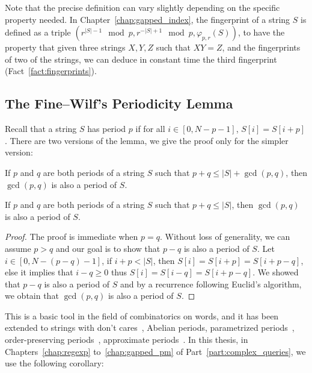 Note that the precise definition can vary slightly depending on the specific property needed. In Chapter~\ref{chap:gapped_index}, the fingerprint of a string $S$ is defined as a triple $(r^{|S|-1} \mod p, r^{-|S|+1} \mod p, \varphi_{p,r}(S))$, to have the property that given three strings $X,Y,Z$ such that $XY =Z$, and the fingerprints of two of the strings, we can deduce in constant time the third fingerprint (Fact~\ref{fact:fingerprints}). 


\subsection{The Fine--Wilf's Periodicity Lemma}\label{sec:prelim:FW}

Recall that a string $S$ has period $p$ if for all $i \in [0,N-p-1]$, $S[i]=S[i+p]$. There are two versions of the lemma, we give the proof only for the simpler version:

\begin{lemma*}
If $p$ and $q$ are both periods of a string $S$ such that $p+q \leq |S|+\gcd(p,q)$, then $\gcd(p,q)$ is also a period of $S$.
\end{lemma*}

\begin{lemma*}
    If $p$ and $q$ are both periods of a string $S$ such that $p+q \leq |S|$, then $\gcd(p,q)$ is also a period of $S$.
\end{lemma*}
\begin{proof}
    The proof is immediate when $p=q$. Without loss of generality, we can assume $p > q$ and our goal is to show that $p-q$ is also a period of $S$. Let $i\in[0,N-(p-q)-1]$, if $i+p < |S|$, then $S[i]=S[i+p]=S[i+p-q]$, else it implies that $i-q \geq 0$ thus $S[i] = S[i-q] = S[i+p-q]$. We showed that $p-q$ is also a period of $S$ and by a recurrence following Euclid's algorithm, we obtain that $\gcd(p,q)$ is also a period of $S$.
\end{proof}


This is a basic tool in the field of combinatorics on words, and it has been extended to strings with don't cares~\cite{Berstel1999,Blanchet-Sadri2008,Blanchet-Sadri2002,Shur2004,Shur2001,Idiatulina2014,Kociumaka2022},
Abelian periods\cite{Constantinescu2006,Blanchet-Sadri2013}, parametrized periods~\cite{Apostolico2008},
order-preserving periods~\cite{Matsuoka2016,GOURDEL2020104463}, approximate periods~\cite{AmirICALP2010,Amir2012,AMIR2015215}.
In this thesis, in Chapters~\ref{chap:regexp} to~\ref{chap:gapped_pm} of Part~\ref{part:complex_queries}, we use the following corollary:

